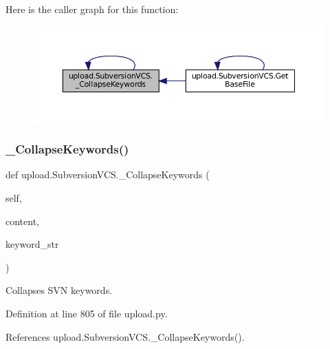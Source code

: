 Here is the caller graph for this function\+:
\nopagebreak
\begin{figure}[H]
\begin{center}
\leavevmode
\includegraphics[width=350pt]{classupload_1_1SubversionVCS_ab484ddd61e217927fb61639bacdbb68d_icgraph}
\end{center}
\end{figure}
\mbox{\label{classupload_1_1SubversionVCS_ab484ddd61e217927fb61639bacdbb68d}} 
\subsubsection{\texorpdfstring{\+\_\+\+Collapse\+Keywords()}{\_CollapseKeywords()}\hspace{0.1cm}{\footnotesize\ttfamily [2/2]}}
{\footnotesize\ttfamily def upload.\+Subversion\+V\+C\+S.\+\_\+\+Collapse\+Keywords (\begin{DoxyParamCaption}\item[{}]{self,  }\item[{}]{content,  }\item[{}]{keyword\+\_\+str }\end{DoxyParamCaption})\hspace{0.3cm}{\ttfamily [private]}}

\begin{DoxyVerb}Collapses SVN keywords.\end{DoxyVerb}
 

Definition at line 805 of file upload.\+py.



References upload.\+Subversion\+V\+C\+S.\+\_\+\+Collapse\+Keywords().


